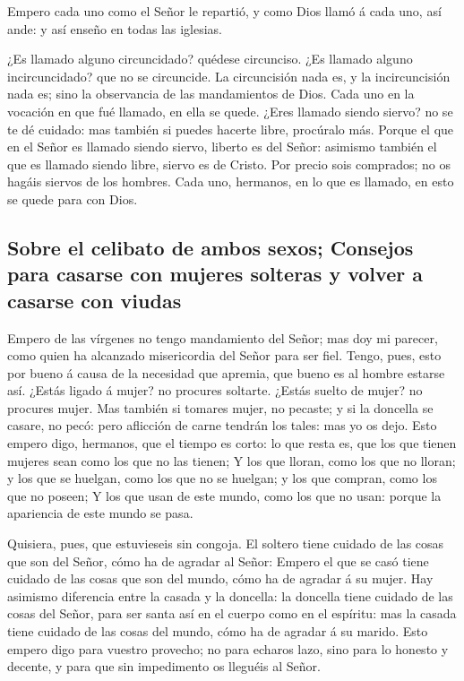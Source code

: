  Empero cada uno como el Señor le repartió, y como Dios
llamó á cada uno, así ande: y así enseño en todas las iglesias.

 ¿Es llamado alguno circuncidado? quédese circunciso. ¿Es
llamado alguno incircuncidado? que no se circuncide.  La
circuncisión nada es, y la incircuncisión nada es; sino la observancia
de las mandamientos de Dios.  Cada uno en la vocación en
que fué llamado, en ella se quede.  ¿Eres llamado siendo
siervo? no se te dé cuidado: mas también si puedes hacerte libre,
procúralo más.  Porque el que en el Señor es llamado siendo
siervo, liberto es del Señor: asimismo también el que es llamado siendo
libre, siervo es de Cristo.  Por precio sois comprados; no
os hagáis siervos de los hombres.  Cada uno, hermanos, en
lo que es llamado, en esto se quede para con Dios.

\hypertarget{sobre-el-celibato-de-ambos-sexos-consejos-para-casarse-con-mujeres-solteras-y-volver-a-casarse-con-viudas}{%
\subsection{Sobre el celibato de ambos sexos; Consejos para casarse con
mujeres solteras y volver a casarse con
viudas}\label{sobre-el-celibato-de-ambos-sexos-consejos-para-casarse-con-mujeres-solteras-y-volver-a-casarse-con-viudas}}

 Empero de las vírgenes no tengo mandamiento del Señor; mas
doy mi parecer, como quien ha alcanzado misericordia del Señor para ser
fiel.  Tengo, pues, esto por bueno á causa de la necesidad
que apremia, que bueno es al hombre estarse así.  ¿Estás
ligado á mujer? no procures soltarte. ¿Estás suelto de mujer? no
procures mujer.  Mas también si tomares mujer, no pecaste;
y si la doncella se casare, no pecó: pero aflicción de carne tendrán los
tales: mas yo os dejo.  Esto empero digo, hermanos, que el
tiempo es corto: lo que resta es, que los que tienen mujeres sean como
los que no las tienen;  Y los que lloran, como los que no
lloran; y los que se huelgan, como los que no se huelgan; y los que
compran, como los que no poseen;  Y los que usan de este
mundo, como los que no usan: porque la apariencia de este mundo se pasa.

 Quisiera, pues, que estuvieseis sin congoja. El soltero
tiene cuidado de las cosas que son del Señor, cómo ha de agradar al
Señor:  Empero el que se casó tiene cuidado de las cosas
que son del mundo, cómo ha de agradar á su mujer.  Hay
asimismo diferencia entre la casada y la doncella: la doncella tiene
cuidado de las cosas del Señor, para ser santa así en el cuerpo como en
el espíritu: mas la casada tiene cuidado de las cosas del mundo, cómo ha
de agradar á su marido.  Esto empero digo para vuestro
provecho; no para echaros lazo, sino para lo honesto y decente, y para
que sin impedimento os lleguéis al Señor.

